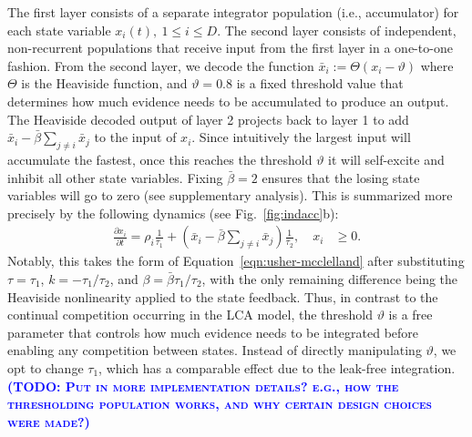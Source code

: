 \documentclass[10pt,letterpaper]{article}
\makeatletter
\newcommand{\todo}[1]{\textbf{\textsc{\textcolor{blue}{(TODO\@: #1)}}}}
\makeatother
\begin{document}
The first layer consists of a separate integrator population (i.e., accumulator) for each state variable $x_i(t), \ 1 \leq i \leq D$.
The second layer consists of independent, non-recurrent populations that receive input from the first layer in a one-to-one fashion.
From the second layer, we decode the function $\bar{x}_i := \Theta(x_i - \vartheta)$ where $\Theta$ is the Heaviside function, and $\vartheta = 0.8$ is a fixed threshold value that determines how much evidence needs to be accumulated to produce an output.
The Heaviside decoded output of layer 2 projects back to layer 1 to add $\bar{x}_i - \bar{\beta} \sum_{j \neq i} \bar{x}_j$ to the input of $x_i$.
Since intuitively the largest input will accumulate the fastest, once this reaches the threshold $\vartheta$ it will self-excite and inhibit all other state variables.
Fixing $\bar{\beta} = 2$ ensures that the losing state variables will go to zero (see supplementary analysis).
This is summarized more precisely by the following dynamics (see Fig.~\ref{fig:indacc}b):
\begin{equation}
    \begin{split}
        \frac{{\partial x}_i}{\partial t} = \rho_i \frac{1}{\tau_1} + \left( 
            \bar{x}_i - \bar{\beta} \sum_{j \neq i} \bar{x}_j \right) \frac{1}{\tau_2} , \quad x_i &\ge 0 .
    \end{split}
\end{equation}
Notably, this takes the form of Equation~\ref{eqn:usher-mcclelland} after substituting $\tau = \tau_1$, $k = -\tau_1/\tau_2$, and $\beta = \bar{\beta}\tau_1/\tau_2$, with the only remaining difference being the Heaviside nonlinearity applied to the state feedback.
Thus, in contrast to the continual competition occurring in the LCA model, the threshold $\vartheta$ is a free parameter that controls how much evidence needs to be integrated before enabling any competition between states.
Instead of directly manipulating $\vartheta$, we opt to change $\tau_1$, which has a comparable effect due to the leak-free integration.
\todo{Put in more implementation details? e.g., how the thresholding population works, and why certain design choices were made?}
\end{document}
